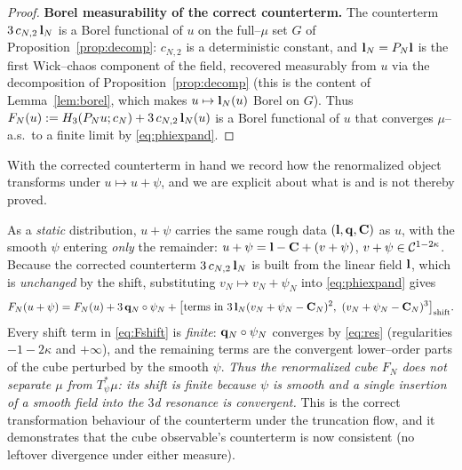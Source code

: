 \begin{proof}
\medskip
\textbf{Borel measurability of the correct counterterm.}
The counterterm $3\,c_{N,2}\,\mathbf{l}_N$ is a Borel functional of $u$ on the
full--$\mu$ set $G$ of Proposition~\ref{prop:decomp}: $c_{N,2}$ is a deterministic
constant, and $\mathbf{l}_N=P_N\mathbf{l}$ is the first Wick--chaos component of the
field, recovered measurably from $u$ via the decomposition of
Proposition~\ref{prop:decomp} (this is the content of Lemma~\ref{lem:borel}, which
makes $u\mapsto\mathbf{l}_N(u)$ Borel on $G$). Thus
$F_N(u):=H_3(P_N u;c_N)+3\,c_{N,2}\,\mathbf{l}_N(u)$ is a Borel functional of
$u$ that converges $\mu$--a.s.\ to a finite limit by \eqref{eq:phiexpand}.
\end{proof}

\begin{remark}\label{rem:event}
With the corrected counterterm in hand we record how the renormalized object
transforms under $u\mapsto u+\psi$, and we are explicit about what is and is not
thereby proved.

As a \emph{static} distribution, $u+\psi$ carries the same rough data
$(\mathbf{l},\mathbf{q},\mathbf{C})$ as $u$, with the smooth $\psi$ entering \emph{only}
the remainder: $u+\psi=\mathbf{l}-\mathbf{C}+(v+\psi)$, $v+\psi\in\mathcal{C}^{1-2\kappa}$.
Because the corrected counterterm $3\,c_{N,2}\,\mathbf{l}_N$ is built from the linear
field $\mathbf{l}$, which is \emph{unchanged} by the shift, substituting
$v_N\mapsto v_N+\psi_N$ into \eqref{eq:phiexpand} gives
\begin{equation}\label{eq:Fshift}
F_N(u+\psi)=F_N(u)+3\,\qoneLsq_N\circ\psi_N+\bigl[\text{terms in }3\,\qoneLin_N(v_N+\psi_N-\qoneIqc_N)^2,\ (v_N+\psi_N-\qoneIqc_N)^3\bigr]_{\text{shift}} .
\end{equation}
Every shift term in \eqref{eq:Fshift} is \emph{finite}: $\mathbf{q}_N\circ\psi_N$
converges by \eqref{eq:res} (regularities $-1-2\kappa$ and $+\infty$), and the
remaining terms are the convergent lower--order parts of the cube perturbed by the
smooth $\psi$. \emph{Thus the renormalized cube $F_N$ does not separate $\mu$ from
$T_\psi^*\mu$: its shift is finite because $\psi$ is smooth and a single insertion
of a smooth field into the $3$d resonance is convergent.} This is the correct
transformation behaviour of the counterterm under the truncation flow, and it
demonstrates that the cube observable's counterterm is now consistent (no leftover
divergence under either measure).


\end{remark}
